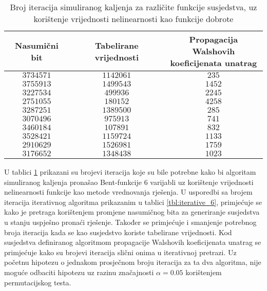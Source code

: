 \begin{table}[]
    \centering
    \begin{tabular}{ccc}
        Nasumični bit & Tabelirane vrijednosti & \makecell{Propagacija Walshovih \\ koeficijenata unatrag} \\ \hline
        $3 734 571$ & $1 142 061$ &   $235$ \\
        $3 755 913$ & $1 499 543$ & $1 452$ \\
        $3 227 534$ &   $499 936$ & $2 245$ \\
        $2 751 055$ &   $180 152$ & $4 258$ \\
        $3 287 251$ & $1 389 500$ &   $285$ \\
        $3 070 496$ &   $975 913$ &   $741$ \\
        $3 460 184$ &   $107 891$ &   $832$ \\
        $3 528 421$ & $1 159 724$ & $1 133$ \\
        $2 910 629$ & $1 526 981$ & $1 759$ \\
        $3 176 652$ & $1 348 438$ & $1 023$
    \end{tabular}
    \captionsetup{justification=centering}
    \caption{Broj iteracija simuliranog kaljenja za različite funkcije susjedstva, uz korištenje vrijednosti nelinearnosti kao funkcije dobrote}
    \label{tbl:simaneal_6_nonl}
\end{table}
U tablici \ref{tbl:simaneal_6_nonl} prikazani su brojevi iteracija koje su bile potrebne kako bi algoritam simuliranog kaljenja pronašao Bent-funkcije 6 varijabli uz korištenje vrijednosti nelinearnosti funkcije kao metode vrednovanja rješenja.
U usporedbi sa brojem iteracija iterativnog algoritma prikazanim u tablici \ref{tbl:iterative_6}, primjećuje se kako je pretraga korištenjem promjene nasumičnog bita za generiranje susjedstva u stanju uspješno pronaći rješenje.
Također se primjećuje i smanjenje potrebnog broja iteracija kada se kao susjedstvo koriste tabelirane vrijednosti.
Kod susjedstva definiranog algoritmom propagacije Walshovih koeficijenata unatrag se primjećuje kako su brojevi iteracija slični onima u iterativnoj pretrazi.
Uz početnu hipotezu o jednakom prosječnom broju iteracija za ta dva algoritma, nije moguće odbaciti hipotezu uz razinu značajnosti $\alpha = 0.05$ korištenjem permutacijskog testa.

